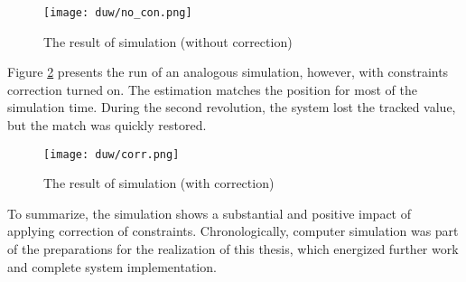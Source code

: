\begin{figure}[!h]
	\centering
	\texttt{[image: duw/no\_con.png]}
	\caption{The result of simulation (without correction)}
	\label{no_con}
\end{figure}

Figure \ref{corr} presents the run of an analogous simulation, however,  with constraints correction turned on. The estimation matches the position for most of the simulation time. During the second revolution, the system lost the tracked value, but the match was quickly restored.

\begin{figure}[!h]
	\centering
	\texttt{[image: duw/corr.png]}
	\caption{The result of simulation (with correction)}
	\label{corr}
\end{figure}

\newpage
To summarize, the simulation shows a substantial and positive impact of applying correction of constraints. Chronologically, computer simulation was part of the preparations for the realization of this thesis, which energized further work and complete system implementation.